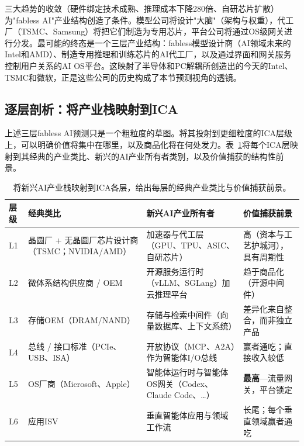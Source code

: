 三大趋势的收敛（硬件绑定技术成熟、推理成本下降280倍、自研芯片扩散）为"fabless AI"产业结构创造了条件。模型公司将设计"大脑"（架构与权重），代工厂（TSMC、Samsung）将把它们制造为专用芯片，平台公司将通过OS级网关进行分发。最可能的终态是一个三层产业结构：fabless模型设计商（AI领域未来的Intel和AMD）、制造专用推理和训练芯片的AI代工厂，以及通过界面和网关服务控制用户关系的AI OS平台。这映射了半导体和PC解耦所创造出的今天的Intel、TSMC和微软，正是这些公司的历史构成了本节预测视角的透镜。

\subsection{逐层剖析：将产业栈映射到ICA}
\label{sec:social-layers}

上述三层fabless AI预测只是一个粗粒度的草图。将其投射到更细粒度的ICA层级上，可以明确价值将集中在哪里，以及商品化将在何处发力。表~\ref{tab:industry-layers}将每个ICA层映射到其经典的产业类比、新兴的AI产业所有者类别，以及价值捕获的结构性前景。

\begin{table}[h]
\centering
\footnotesize
\caption{将新兴AI产业栈映射到ICA各层，给出每层的经典产业类比与价值捕获前景。}
\label{tab:industry-layers}
\begin{tabularx}{\textwidth}{>{\raggedright\arraybackslash}p{}>{\raggedright\arraybackslash}p{}>{\raggedright\arraybackslash}p{}>{\raggedright\arraybackslash}p{}}
\toprule
\textbf{层级} & \textbf{经典类比} & \textbf{新兴AI产业所有者} & \textbf{价值捕获前景} \\
\midrule
L1 & 晶圆厂 + 无晶圆厂芯片设计商（TSMC；NVIDIA/AMD） & 加速器与代工层（GPU、TPU、ASIC、自研芯片） & 高（资本与工艺护城河），具有周期性 \\
L2 & 微体系结构供应商 / OEM & 开源服务运行时（vLLM、SGLang）加云推理平台 & 趋于商品化（开源中间件） \\
L3 & 存储OEM（DRAM/NAND） & 存储与检索中间件（向量数据库、上下文系统） & 差异化来自整合，而非独立产品 \\
L4 & 总线 / 接口标准（PCIe、USB、ISA） & 开放协议（MCP、A2A）作为智能体I/O总线 & 赢者通吃；直接收入较低 \\
L5 & OS厂商（Microsoft、Apple） & 智能体运行时与智能体OS网关（Codex、Claude Code、\ldots） & \textbf{最高}---流量网关，平台锁定 \\
L6 & 应用ISV & 垂直智能体应用与领域工作流 & 长尾；每个垂直领域赢者通吃 \\
\bottomrule
\end{tabularx}
\end{table}


